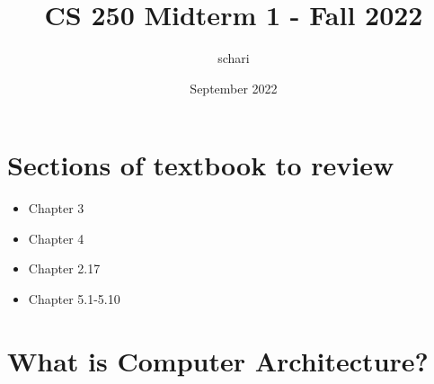 \documentclass{article}
\title{CS 250 Midterm 1 - Fall 2022}
\author{schari}
\date{September 2022}
\begin{document}
\maketitle

\section{Sections of textbook to review}
\begin{itemize}
	\item Chapter 3
	\item Chapter 4
	\item Chapter 2.17
	\item Chapter 5.1-5.10
\end{itemize}

\section{What is Computer Architecture?}
\end{document}

